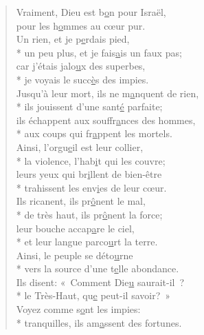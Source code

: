 
\begin{verse}
Vraiment, Dieu est b\underline{o}n pour Israël, \\
pour les h\underline{o}mmes au cœur pur. \\

Un rien, et je p\underline{e}rdais pied, \\*
un peu plus, et je fais\underline{a}is un faux pas; \\
car j’étais jalo\underline{u}x des superbes, \\*
je voyais le succ\underline{è}s des impies. \\

Jusqu’à leur mort, ils ne m\underline{a}nquent de rien, \\*
ils jouissent d’une sant\underline{é} parfaite; \\
ils échappent aux souffr\underline{a}nces des hommes, \\*
aux coups qui fr\underline{a}ppent les mortels. \\

Ainsi, l’orgu\underline{e}il est leur collier, \\*
la violence, l’hab\underline{i}t qui les couvre; \\
leurs yeux qui br\underline{i}llent de bien-être \\*
trahissent les env\underline{i}es de leur cœur. \\

Ils ricanent, ils pr\underline{ô}nent le mal, \\*
de très haut, ils pr\underline{ô}nent la force; \\
leur bouche accap\underline{a}re le ciel, \\*
et leur langue parco\underline{u}rt la terre. \\

Ainsi, le peuple se déto\underline{u}rne \\*
vers la source d’une t\underline{e}lle abondance. \\
Ils disent: « Comment Die\underline{u} saurait-il ? \\*
le Très-Haut, qu\underline{e} peut-il savoir? » \\

Voyez comme s\underline{o}nt les impies: \\*
tranquilles, ils am\underline{a}ssent des fortunes. \\


\end{verse}
